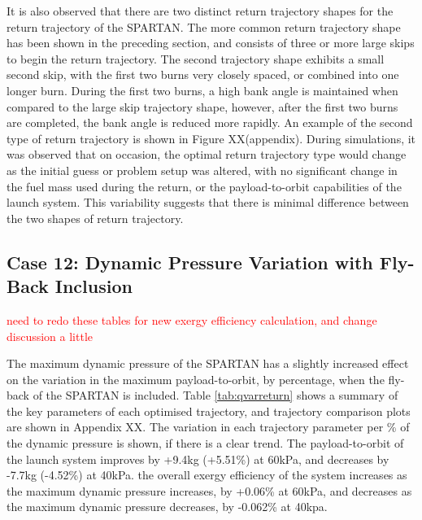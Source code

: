 It is also observed that there are two distinct return trajectory shapes for the return trajectory of the SPARTAN. The more common return trajectory shape has been shown in the preceding section, and consists of three or more large skips to begin the return trajectory. The second trajectory shape exhibits a small second skip, with the first two burns very closely spaced, or combined into one longer burn. During the first two burns, a high bank angle is maintained  when compared to the large skip trajectory shape, however, after the first two burns are completed, the bank angle is reduced more rapidly. 
An example of the second type of return trajectory is shown in Figure XX(appendix). 
During simulations, it was observed that on occasion, the optimal return trajectory type would change as the initial guess or problem setup was altered, with no significant change in the fuel mass used during the return, or the payload-to-orbit capabilities of the launch system. This variability suggests that there is minimal difference between the two shapes of return trajectory. 





\subsection{Case 12: Dynamic Pressure Variation with Fly-Back Inclusion}

\textcolor{red}{need to redo these tables for new exergy efficiency calculation, and change discussion a little}

The maximum dynamic pressure of the SPARTAN has a slightly increased effect on the variation in the maximum payload-to-orbit, by percentage, when the fly-back of the SPARTAN is included. 
Table \ref{tab:qvarreturn} shows a summary of the key parameters of each optimised trajectory, and trajectory comparison plots are shown in Appendix XX. The variation in each trajectory parameter per \% of the dynamic pressure is shown, if there is a clear trend. The payload-to-orbit of the launch system improves by +9.4kg (+5.51\%) at 60kPa, and decreases by -7.7kg (-4.52\%) at 40kPa.
the overall exergy efficiency of the system increases as the maximum dynamic pressure increases, by +0.06\% at 60kPa, and decreases as the maximum dynamic pressure decreases, by -0.062\% at 40kpa. 

